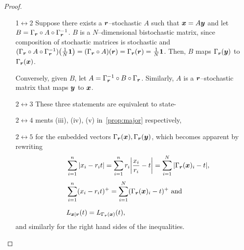 \begin{proof}$ $\vspace{-12pt}\\
\begin{enumerate}
	\item[1$\leftrightarrow2$]
	Suppose there exists a $\boldsymbol{r}$--stochastic $A$ such that $\bm{x} = A\bm{y}$ and let $B = \Gamma_{\boldsymbol{r}} \circ A \circ \Gamma_{\boldsymbol{r}}^{-1}$.
$B$ is a $N$--dimensional bistochastic matrix, since composition of stochastic matrices is stochastic and $(\Gamma_{\boldsymbol{r}} \circ A \circ \Gamma_{\boldsymbol{r}}^{-1})\big(\frac{1}{N}\bm{1}\big) = (\Gamma_{\boldsymbol{r}} \circ A) (\boldsymbol{r}) = \Gamma_{\boldsymbol{r}}(\boldsymbol{r}) = \frac{1}{N}\bm{1}$. Then, $B$ maps $\Gamma_{\boldsymbol{r}}({\bm{y}})$ to $\Gamma_{\boldsymbol{r}}({\bm{x}})$.

	Conversely, given $B$, let $A = \Gamma_{\boldsymbol{r}}^{-1} \circ B \circ \Gamma_{\boldsymbol{r}}$.
	Similarly, $A$ is a $\boldsymbol{r}$--stochastic matrix that maps $\bm{y}$ to $\bm{x}$.
	\item[$2\leftrightarrow3$] These \hspace{1pt} three \hspace{1pt} statements \hspace{1pt} are \hspace{1pt} equivalent \hspace{1pt} to \hspace{1pt} state-
	\item[$2\leftrightarrow4$] \vspace{-7pt} ments (iii), (iv), (v) \hspace{1pt} in~\cref{prop:major} respectively, 
	\item[$2\leftrightarrow5$] \vspace{-7pt} for the embedded vectors $\Gamma_{\boldsymbol{r}}({\bm{x}}), \Gamma_{\boldsymbol{r}}({\bm{y}})$, which becomes apparent by rewriting
	\begin{align*}
	&\hspace{15pt} \sum\limits_{i=1}^n \abs{x_i - r_i t} = \sum\limits_{i=1}^n r_i \abs{\frac{x_i}{r_i} - t} = \sum\limits_{i=1}^N \abs{\Gamma_{\boldsymbol{r}}(\bm{x})_i - t}, \\[3pt]
	&\hspace{15pt} \sum\limits_{i=1}^n (x_i - r_i t)^+ = \sum\limits_{i=1}^N (\Gamma_{\boldsymbol{r}}(\bm{x})_i - t)^+ \text{ and} \\[6pt]
	&\hspace{15pt} L_{\bm{x}|\boldsymbol{r}}(t) = L_{\Gamma_{\boldsymbol{r}}(\bm{x})}(t),
	\end{align*} 
and similarly for the right hand sides of the inequalities.
\end{enumerate}
\vspace{-19pt}
\end{proof}

